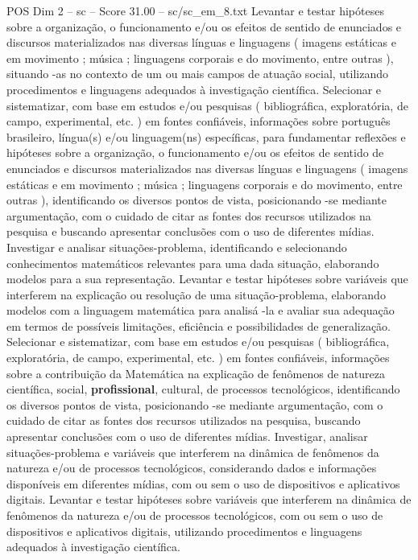 \begin{textsample}{POS Dim 2 – sc – Score 31.00 – sc/sc\_em\_8.txt}
Levantar e testar hipóteses sobre a organização, o funcionamento e/ou os efeitos de sentido de enunciados e discursos materializados nas diversas línguas e linguagens ( imagens estáticas e em movimento ; música ; linguagens corporais e do movimento, entre outras ), situando -as no contexto de um ou mais campos de atuação social, utilizando procedimentos e linguagens adequados à investigação científica.
Selecionar e sistematizar, com base em estudos e/ou pesquisas ( bibliográfica, exploratória, de campo, experimental, etc. ) em fontes confiáveis, informações sobre português brasileiro, língua(s) e/ou linguagem(ns) específicas, para fundamentar reflexões e hipóteses sobre a organização, o funcionamento e/ou os efeitos de sentido de enunciados e discursos materializados nas diversas línguas e linguagens ( imagens estáticas e em movimento ; música ; linguagens corporais e do movimento, entre outras ), identificando os diversos pontos de vista, posicionando -se mediante argumentação, com o cuidado de citar as fontes dos recursos utilizados na pesquisa e buscando apresentar conclusões com o uso de diferentes mídias.
Investigar e analisar situações-problema, identificando e selecionando conhecimentos matemáticos relevantes para uma dada situação, elaborando modelos para a sua representação.
Levantar e testar hipóteses sobre variáveis que interferem na explicação ou resolução de uma situação-problema, elaborando modelos com a linguagem matemática para analisá -la e avaliar sua adequação em termos de possíveis limitações, eficiência e possibilidades de generalização.
Selecionar e sistematizar, com base em estudos e/ou pesquisas ( bibliográfica, exploratória, de campo, experimental, etc. ) em fontes confiáveis, informações sobre a contribuição da Matemática na explicação de fenômenos de natureza científica, social, \textbf{profissional}, cultural, de processos tecnológicos, identificando os diversos pontos de vista, posicionando -se mediante argumentação, com o cuidado de citar as fontes dos recursos utilizados na pesquisa, buscando apresentar conclusões com o uso de diferentes mídias.
Investigar, analisar situações-problema e variáveis que interferem na dinâmica de fenômenos da natureza e/ou de processos tecnológicos, considerando dados e informações disponíveis em diferentes mídias, com ou sem o uso de dispositivos e aplicativos digitais.
Levantar e testar hipóteses sobre variáveis que interferem na dinâmica de fenômenos da natureza e/ou de processos tecnológicos, com ou sem o uso de dispositivos e aplicativos digitais, utilizando procedimentos e linguagens adequados à investigação científica.

\end{textsample}
